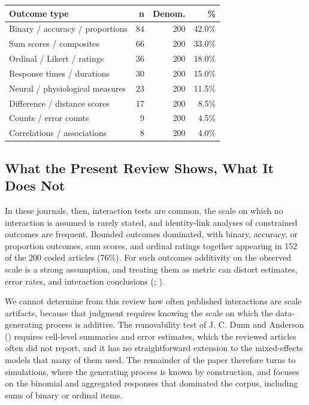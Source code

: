 \documentclass[
  man,
  floatsintext,
  longtable,
  nolmodern,
  notxfonts,
  notimes,
  colorlinks=true,linkcolor=blue,citecolor=blue,urlcolor=blue]{apa7}
\newcounter{none} %
\begin{document}
\begin{table}

{\caption{{Broad response-variable categories in the coded articles.
Categories are non-exclusive, so one article can contribute to more than
one row.}{\label{tbl-review-outcome-types}}}
\vspace{-20pt}}

{\def\LTcaptype{none} %
\begin{longtable}[]{@{}lrrr@{}}
\toprule\noalign{}
Outcome type & n & Denom. & \% \\
\midrule\noalign{}
\endhead
\bottomrule\noalign{}
\endlastfoot
Binary / accuracy / proportions & 84 & 200 & 42.0\% \\
Sum scores / composites & 66 & 200 & 33.0\% \\
Ordinal / Likert / ratings & 36 & 200 & 18.0\% \\
Response times / durations & 30 & 200 & 15.0\% \\
Neural / physiological measures & 23 & 200 & 11.5\% \\
Difference / distance scores & 17 & 200 & 8.5\% \\
Counts / error counts & 9 & 200 & 4.5\% \\
Correlations / associations & 8 & 200 & 4.0\% \\
\end{longtable}
}

\end{table}

\subsection{What the Present Review Shows, What It Does
Not}\label{what-the-present-review-shows-what-it-does-not}

In these journals, then, interaction tests are common, the scale on
which no interaction is assumed is rarely stated, and identity-link
analyses of constrained outcomes are frequent. Bounded outcomes
dominated, with binary, accuracy, or proportion outcomes, sum scores,
and ordinal ratings together appearing in 152 of the 200 coded articles
(76\%). For such outcomes additivity on the observed scale is a strong
assumption, and treating them as metric can distort estimates, error
rates, and interaction conclusions
(;
).

We cannot determine from this review how often published interactions
are scale artifacts, because that judgment requires knowing the scale on
which the data-generating process is additive. The removability test of
J. C. Dunn and Anderson () requires
cell-level summaries and error estimates, which the reviewed articles
often did not report, and it has no straightforward extension to the
mixed-effects models that many of them used. The remainder of the paper
therefore turns to simulations, where the generating process is known by
construction, and focuses on the binomial and aggregated responses that
dominated the corpus, including sums of binary or ordinal items.
\end{document}

